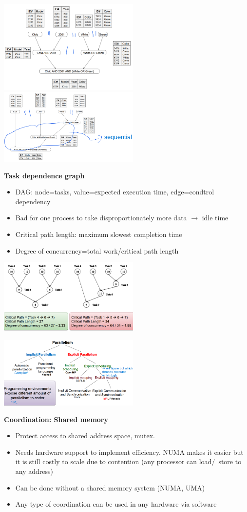 \documentclass[10pt, landscape]{article}
\begin{document}
\begin{multicols}{4}
\includegraphics*[width=7cm]{decomp_a}
\includegraphics*[width=7cm]{decomp_b}

\textbf{Task dependence graph}
\begin{itemize}
    \item DAG: node=tasks, value=expected execution time, edge=condtrol dependency
    \item Bad for one process to take disproportionately more data $\rightarrow$ idle time   
    \item Critical path length: maximum slowest completion time 
    \item Degree of concurrency=total work/critical path length
\end{itemize}
\includegraphics*[width=7cm]{task_dependence}

\includegraphics*[width=7cm]{types_parallelism}

\textbf{Coordination: Shared memory}
\begin{itemize}
    \item Protect access to shared address space, mutex.
    \item Needs hardware support to implement efficiency. NUMA makes it easier but it is still costly to scale due to contention (any processor can load/\ store to any address)
    \item Can be done without a shared memory system (NUMA, UMA)
    \item Any type of coordination can be used in any hardware via software
\end{itemize}


\end{multicols}
\end{document}
